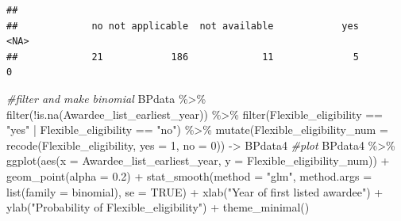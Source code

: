 \documentclass[
]{article}
\newenvironment{Shaded}{\begin{snugshade}}{\end{snugshade}}
\newcommand{\AttributeTok}[1]{\textcolor[rgb]{0.77,0.63,0.00}{#1}}
\newcommand{\CommentTok}[1]{\textcolor[rgb]{0.56,0.35,0.01}{\textit{#1}}}
\newcommand{\ConstantTok}[1]{\textcolor[rgb]{0.00,0.00,0.00}{#1}}
\newcommand{\DecValTok}[1]{\textcolor[rgb]{0.00,0.00,0.81}{#1}}
\newcommand{\DocumentationTok}[1]{\textcolor[rgb]{0.56,0.35,0.01}{\textbf{\textit{#1}}}}
\newcommand{\FloatTok}[1]{\textcolor[rgb]{0.00,0.00,0.81}{#1}}
\newcommand{\FunctionTok}[1]{\textcolor[rgb]{0.00,0.00,0.00}{#1}}
\newcommand{\NormalTok}[1]{#1}
\newcommand{\OtherTok}[1]{\textcolor[rgb]{0.56,0.35,0.01}{#1}}
\newcommand{\SpecialCharTok}[1]{\textcolor[rgb]{0.00,0.00,0.00}{#1}}
\newcommand{\StringTok}[1]{\textcolor[rgb]{0.31,0.60,0.02}{#1}}
\begin{document}
\begin{Shaded}
\end{Shaded}

\begin{verbatim}
## 
##             no not applicable  not available            yes           <NA> 
##             21            186             11              5              0
\end{verbatim}

\begin{Shaded}
\begin{Highlighting}[]
\CommentTok{\#filter and make binomial }
\NormalTok{BPdata }\SpecialCharTok{\%\textgreater{}\%} 
  \FunctionTok{filter}\NormalTok{(}\SpecialCharTok{!}\FunctionTok{is.na}\NormalTok{(Awardee\_list\_earliest\_year)) }\SpecialCharTok{\%\textgreater{}\%} 
  \FunctionTok{filter}\NormalTok{(Flexible\_eligibility }\SpecialCharTok{==} \StringTok{"yes"} \SpecialCharTok{|}\NormalTok{ Flexible\_eligibility }\SpecialCharTok{==} \StringTok{"no"}\NormalTok{) }\SpecialCharTok{\%\textgreater{}\%}  
  \FunctionTok{mutate}\NormalTok{(}\AttributeTok{Flexible\_eligibility\_num =} \FunctionTok{recode}\NormalTok{(Flexible\_eligibility, }\AttributeTok{yes =} \DecValTok{1}\NormalTok{, }\AttributeTok{no =} \DecValTok{0}\NormalTok{)) }\OtherTok{{-}\textgreater{}}\NormalTok{ BPdata4}
\CommentTok{\#plot}
\NormalTok{BPdata4 }\SpecialCharTok{\%\textgreater{}\%} 
  \FunctionTok{ggplot}\NormalTok{(}\FunctionTok{aes}\NormalTok{(}\AttributeTok{x =}\NormalTok{ Awardee\_list\_earliest\_year, }\AttributeTok{y =}\NormalTok{ Flexible\_eligibility\_num)) }\SpecialCharTok{+} 
  \FunctionTok{geom\_point}\NormalTok{(}\AttributeTok{alpha =} \FloatTok{0.2}\NormalTok{) }\SpecialCharTok{+} 
  \FunctionTok{stat\_smooth}\NormalTok{(}\AttributeTok{method =} \StringTok{"glm"}\NormalTok{, }\AttributeTok{method.args =} \FunctionTok{list}\NormalTok{(}\AttributeTok{family =}\NormalTok{ binomial), }\AttributeTok{se =} \ConstantTok{TRUE}\NormalTok{) }\SpecialCharTok{+}
  \FunctionTok{xlab}\NormalTok{(}\StringTok{"Year of first listed awardee"}\NormalTok{) }\SpecialCharTok{+} 
  \FunctionTok{ylab}\NormalTok{(}\StringTok{"Probability of Flexible\_eligibility"}\NormalTok{) }\SpecialCharTok{+}
  \FunctionTok{theme\_minimal}\NormalTok{()}
\end{Highlighting}
\end{Shaded}
\end{document}
